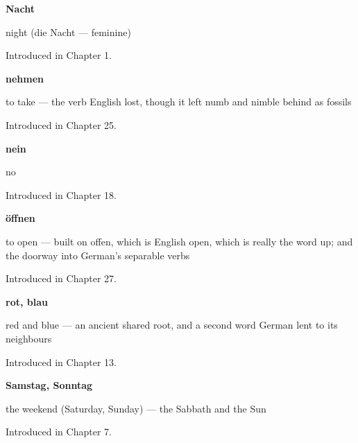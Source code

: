 \noindent\begin{minipage}[t]{\linewidth}
\raggedright
\textbf{Nacht}\par
\small night (die Nacht — feminine)\par
\footnotesize Introduced in Chapter 1.
\end{minipage}\par\medskip

\noindent\begin{minipage}[t]{\linewidth}
\raggedright
\textbf{nehmen}\par
\small to take — the verb English lost, though it left numb and nimble behind as fossils\par
\footnotesize Introduced in Chapter 25.
\end{minipage}\par\medskip

\noindent\begin{minipage}[t]{\linewidth}
\raggedright
\textbf{nein}\par
\small no\par
\footnotesize Introduced in Chapter 18.
\end{minipage}\par\medskip

\noindent\begin{minipage}[t]{\linewidth}
\raggedright
\textbf{öffnen}\par
\small to open — built on offen, which is English open, which is really the word up; and the doorway into German's separable verbs\par
\footnotesize Introduced in Chapter 27.
\end{minipage}\par\medskip

\noindent\begin{minipage}[t]{\linewidth}
\raggedright
\textbf{rot, blau}\par
\small red and blue — an ancient shared root, and a second word German lent to its neighbours\par
\footnotesize Introduced in Chapter 13.
\end{minipage}\par\medskip

\noindent\begin{minipage}[t]{\linewidth}
\raggedright
\textbf{Samstag, Sonntag}\par
\small the weekend (Saturday, Sunday) — the Sabbath and the Sun\par
\footnotesize Introduced in Chapter 7.
\end{minipage}\par\medskip

